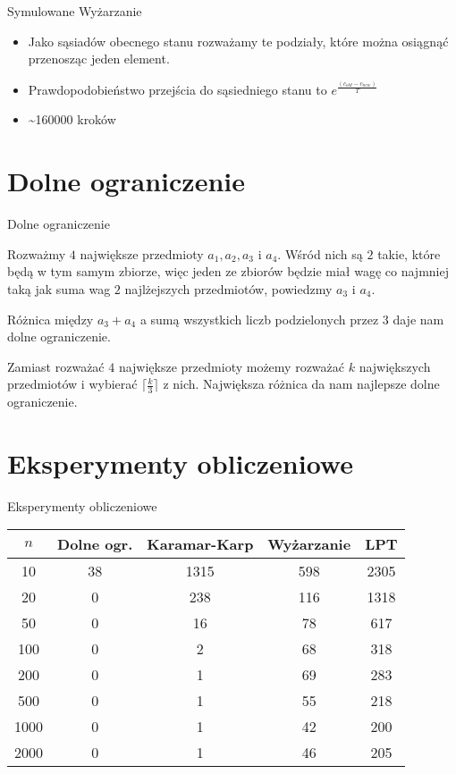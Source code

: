 \documentclass{beamer}
\begin{document}
\begin{frame}{Symulowane Wyżarzanie}
  \begin{itemize}
    \item Jako sąsiadów obecnego stanu rozważamy te podziały, które można osiągnąć przenosząc jeden element.
    \item Prawdopodobieństwo przejścia do sąsiedniego stanu to $e^{\frac{(c_{old} - c_{new})}{T}}$
    \item \textasciitilde 160000 kroków
  \end{itemize}
  \end{frame}

\section{Dolne ograniczenie}

\begin{frame}[t]{Dolne ograniczenie}

Rozważmy $4$ największe przedmioty $a_1, a_2, a_3$ i $a_4$. Wśród nich są $2$ takie, które będą w tym samym zbiorze, więc jeden ze zbiorów będzie miał wagę co najmniej taką jak suma wag $2$ najlżejszych przedmiotów, powiedzmy $a_3$ i $a_4$.

Różnica między $a_3+a_4$ a sumą wszystkich liczb podzielonych przez $3$ daje nam dolne ograniczenie.

\pause

Zamiast rozważać $4$ największe przedmioty możemy rozważać $k$ największych przedmiotów i wybierać $\lceil \frac{k}{3} \rceil$ z nich. Największa różnica da nam najlepsze dolne ograniczenie.

\end{frame}

\section{Eksperymenty obliczeniowe}

\begin{frame}{Eksperymenty obliczeniowe}
  \begin{tabular}{|c|c|c|c|c|}
  \hline
  $n$  & Dolne ogr. & Karamar-Karp & Wyżarzanie & LPT \\
  \hline
  10 & 38 & 1315 & 598 & 2305 \\
  \hline
  20 & 0 & 238 & 116 & 1318 \\
  \hline
  50 & 0 & 16 & 78 & 617 \\
  \hline
  100 & 0 & 2 & 68 & 318 \\
  \hline
  200 & 0 & 1 & 69 & 283 \\
  \hline
  500 & 0 & 1 & 55 & 218 \\
  \hline
  1000 & 0 & 1 & 42 & 200 \\
  \hline
  2000 & 0 & 1 & 46 & 205 \\
  \hline
  \end{tabular}
\end{frame}
\end{document}
